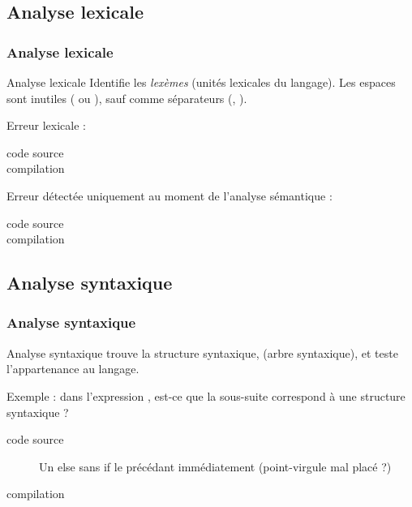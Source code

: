 \documentclass[xcolor=pdftex,svgnames,table]{beamer}
\begin{document}
\subsection{Analyse lexicale}
\begin{frame}
  \frametitle{Analyse lexicale}
\begin{block}{Analyse lexicale}
 Identifie les \emph{lexèmes} (unités lexicales du langage). Les espaces sont inutiles ( ou ), sauf comme séparateurs (, ).
\end{block}
\pause
Erreur lexicale :
\begin{description}
\item[code source] 
\item[compilation] 
\end{description}
\pause
Erreur détectée uniquement au moment de l'analyse sémantique :\\
\begin{description}
\item[code source] 
\item[compilation]  
\end{description}
\end{frame}

\subsection{Analyse syntaxique}
\begin{frame}
  \frametitle{Analyse syntaxique}
\begin{block}{Analyse syntaxique\youwrite} 
trouve la structure syntaxique, (arbre
  syntaxique), et teste l'appartenance au langage. 
\end{block}
\pause
Exemple : dans l'expression , est-ce que la
sous-suite   correspond à une structure syntaxique ? 
\pause
\begin{center}
\end{center}
\pause
\begin{description}
\item[code source] Un else sans if le précédant immédiatement (point-virgule mal placé ?)
\item[compilation]  
\end{description}

\end{frame}
\end{document}
